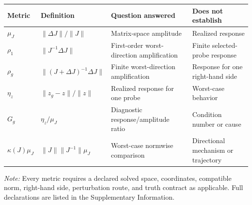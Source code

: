 \begin{tabularx}{0.98\textwidth}{@{}>{\raggedright\arraybackslash}p{}>{\raggedright\arraybackslash}p{}XX@{}}
\toprule
\textbf{Metric} & \textbf{Definition} & \textbf{Question answered} & \textbf{Does not establish} \\
\midrule
$\mu_J$ & $\lVert\Delta J\rVert/\lVert J\rVert$ & Matrix-space amplitude & Realized response \\
$\rho_1$ & $\lVert J^{-1}\Delta J\rVert$ & First-order worst-direction amplification & Finite selected-probe response \\
$\rho_g$ & $\lVert(J+\Delta J)^{-1}\Delta J\rVert$ & Finite worst-direction amplification & Response for one right-hand side \\
$\eta_z$ & $\lVert z_g-z\rVert/\lVert z\rVert$ & Realized response for one probe & Worst-case behavior \\
$G_g$ & $\eta_z/\mu_J$ & Diagnostic response/amplitude ratio & Condition number or cause \\
$\kappa(J)\mu_J$ & $\lVert J\rVert\lVert J^{-1}\rVert\mu_J$ & Worst-case normwise comparison & Directional mechanism or trajectory \\
\bottomrule
\end{tabularx}
\par\vspace{2pt}\footnotesize\emph{Note:} Every metric requires a declared solved space, coordinates, compatible norm, right-hand side, perturbation route, and truth contract as applicable. Full declarations are listed in the Supplementary Information.
